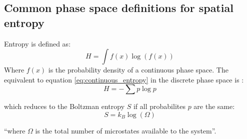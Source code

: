 \documentclass[fleqn,10pt]{wlscirep}
\begin{document}
\subsection*{Common phase space definitions for spatial entropy}
Entropy is defined as\cite{Shannon}:
\begin{equation}
\label{eq:continuous_entropy}
 H = \int{f(x) \log(f(x))}
\end{equation}
Where $f(x)$ is the probability density of a continuous phase space. The equivalent to equation \ref{eq:continuous_entropy} in the discrete phase space is \cite{Shannon}:
\begin{equation}
\label{eq:shannon_entropy}
 H = -\sum{p \log{p}}
\end{equation}

which reduces to the Boltzman entropy $S$ if all probabilites $p$ are the same:
\begin{equation}
\label{eq:boltzman_entropy}
 S = k_B \log(\Omega)
\end{equation}

``where $\Omega$ is the total number of microstates available to the system''\cite[p.44]{BoltzmannOmega}.
\end{document}
